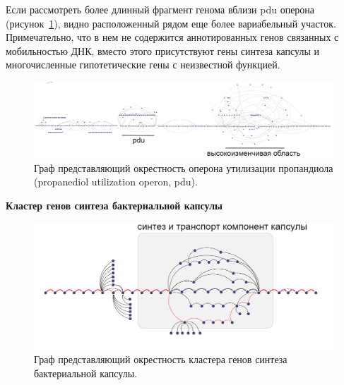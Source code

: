 Если рассмотреть более длинный фрагмент генома вблизи pdu оперона  (рисунок~\ref{img:pdu_wide}), видно расположенный рядом еще более вариабельный участок. Примечательно, что в нем не содержится аннотированных генов связанных с мобильностью ДНК, вместо этого присутствуют гены синтеза капсулы и многочисленные гипотетические гены с неизвестной функцией. 

\begin{figure}[!ht] 
  \center
    \includegraphics[width=\textwidth]{Dissertation/images/subgraphs/subgraph_largest.png}
  \caption{Граф представляющий окрестность оперона утилизации пропандиола (propanediol utilization operon, pdu). }
  \label{img:pdu_wide} 
\end{figure}

\textbf{Кластер генов синтеза бактериальной капсулы}

\begin{figure}[!ht] 
  \center
    \includegraphics[width=\textwidth]{Dissertation/images/subgraphs/capsular_subgraph.png}
  \caption{Граф представляющий окрестность кластера генов синтеза бактериальной капсулы. }
  \label{img:capsule_sub_small} 
\end{figure}

